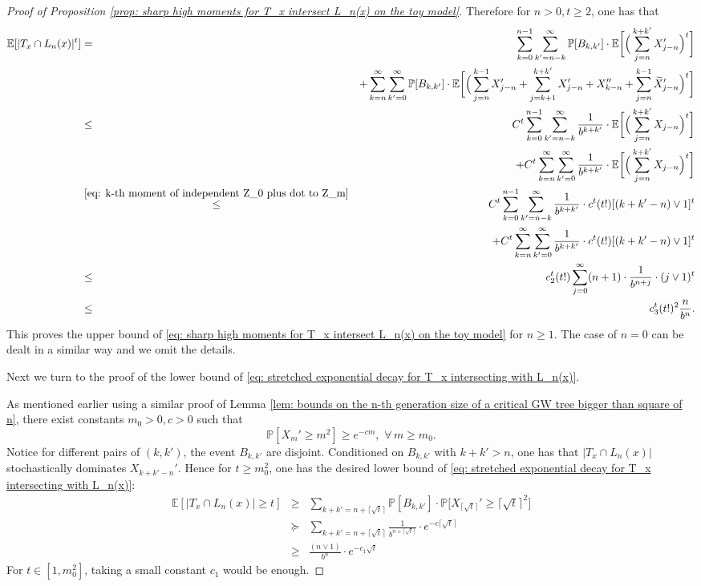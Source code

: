 \documentclass[12pt]{article}
\numberwithin{equation}{section}
\newcommand{\1}{\mathbf{1}}
\begin{document}
\begin{proof}[Proof of Proposition \ref{prop: sharp high moments for T_x intersect L_n(x) on the toy model}]
Therefore for $n>0,t\geq2$, one has that 
\begin{eqnarray}\label{eq: c18 for high moments of T_x cap L_n}
\mathbb{E}[|T_x\cap L_n(x)|^t]&=&
\sum_{k=0}^{n-1}\sum_{k'=n-k}^{\infty}\mathbb{P}[B_{k,k'}]\cdot \mathbb{E}\bigg[\Big(\sum_{j=n}^{k+k'}X_{j-n}'\Big)^t\bigg] \nonumber\\
&&+\sum_{k=n}^{\infty}\sum_{k'=0}^{\infty}\mathbb{P}[B_{k,k'}]\cdot \mathbb{E}\bigg[\Big(\sum_{j=n}^{k-1}X_{j-n}'+\sum_{j=k+1}^{k+k'}X_{j-n}'+X_{k-n}''+\sum_{j=n}^{k-1}\widetilde{X}_{j-n}'\Big)^t\bigg] \nonumber\\
&\leq &C^t\sum_{k=0}^{n-1}\sum_{k'=n-k}^{\infty}\frac{1}{b^{k+k'}}\cdot \mathbb{E}\bigg[\Big(\sum_{j=n}^{k+k'}X_{j-n}\Big)^t\bigg]\nonumber\\
&& +C^t\sum_{k=n}^{\infty}\sum_{k'=0}^{\infty}\frac{1}{b^{k+k'}}\cdot \mathbb{E}\bigg[\Big(\sum_{j=n}^{k+k'}X_{j-n}\Big)^t\bigg] \nonumber\\
&\stackrel{\eqref{eq: k-th moment of independent Z_0 plus dot to Z_m}}{\leq}& 
C^t\sum_{k=0}^{n-1}\sum_{k'=n-k}^{\infty}\frac{1}{b^{k+k'}}\cdot c^t(t!)[(k+k'-n)\vee 1]^{t}\nonumber\\
&&+C^t\sum_{k=n}^{\infty}\sum_{k'=0}^{\infty}\frac{1}{b^{k+k'}}\cdot c^t(t!)[(k+k'-n)\vee 1]^{t}\nonumber\\&\leq& c_2^t(t!)\sum_{j=0}^{\infty}(n+1)\cdot \frac{1}{b^{n+j}}\cdot (j\vee 1)^t\nonumber\\
&\leq & c_3^t(t!)^2\frac{n}{b^n}.
\end{eqnarray}
This proves the upper bound of \eqref{eq: sharp high moments for T_x intersect L_n(x) on the toy model} for $n\geq1$. The case of $n=0$ can be dealt in a similar way and we omit the details. 

Next we turn to the proof of the lower bound of \eqref{eq: stretched exponential decay for T_x intersecting with L_n(x)}. 

As mentioned earlier using a similar proof of Lemma \ref{lem: bounds on the n-th generation size of a critical GW tree bigger than square of n},  there exist constants $m_0>0,c>0$ such that  
\[
\mathbb{P}[X_m'\geq m^2]\geq e^{-cm},\,\,\forall \, m\geq m_0.
\]
Notice for different pairs of $(k,k')$, the event $B_{k,k'}$ are disjoint. Conditioned on $B_{k,k'}$ with $k+k'>n$, one has that $|T_x\cap L_n(x)|$ stochastically dominates $X_{k+k'-n}'$. Hence for $t\geq m_0^2$, one has the desired lower bound of \eqref{eq: stretched exponential decay for T_x intersecting with L_n(x)}:
\begin{eqnarray}
\mathbb{E}[|T_x\cap L_n(x)|\geq t]
&\geq&\sum_{k+k'=n+\lceil\sqrt{t}\rceil}\mathbb{P}[B_{k,k'}]\cdot \mathbb{P}\big[X_{\lceil\sqrt{t}\rceil}'\geq \lceil\sqrt{t}\rceil^2\big] \nonumber\\
&\succeq&\sum_{k+k'=n+\lceil\sqrt{t}\rceil}\frac{1}{b^{n+\lceil\sqrt{t}\rceil}}\cdot e^{-c\lceil\sqrt{t}\rceil}\nonumber\\
&\geq&\frac{(n\vee 1)}{b^{n}}\cdot e^{-c_1\sqrt{t}}
\end{eqnarray} 
For $t\in[1,m_0^2]$, taking a small constant $c_1$ would be enough. 
\end{proof}
\end{document}
